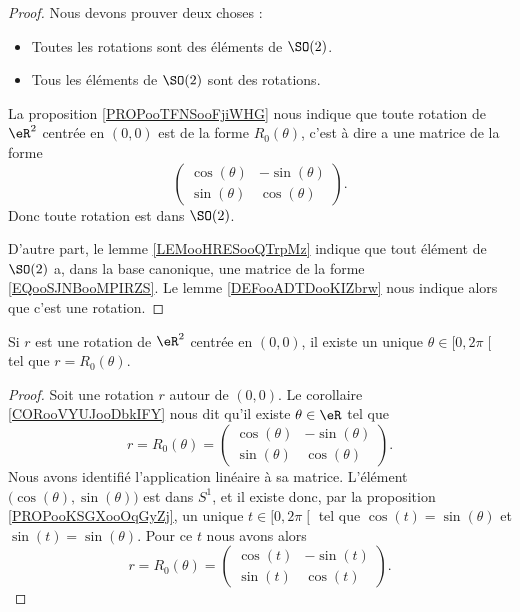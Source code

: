 \begin{proof}

    Nous devons prouver deux choses : 
    \begin{itemize}
        \item Toutes les rotations sont des éléments de \( \SO(2)\).
        \item Tous les éléments de \( \SO(2)\) sont des rotations.
    \end{itemize}

    La proposition \ref{PROPooTFNSooFjiWHG} nous indique que toute rotation de \( \eR^2\) centrée en \( (0,0)\) est de la forme \( R_0(\theta)\), c'est à dire a une matrice de la forme
    \begin{equation}        \label{EQooSJNBooMPIRZS}
        \begin{pmatrix}
            \cos(\theta)    &   -\sin(\theta)    \\
            \sin(\theta)    &   \cos(\theta)
        \end{pmatrix}.
    \end{equation}
    Donc toute rotation est dans \( \SO(2)\).

    D'autre part, le lemme \ref{LEMooHRESooQTrpMz} indique que tout élément de \( \SO(2)\) a, dans la base canonique, une matrice de la forme \eqref{EQooSJNBooMPIRZS}. Le lemme \ref{DEFooADTDooKIZbrw} nous indique alors que c'est une rotation.
\end{proof}

\begin{proposition}         \label{PROPooOTIVooZpvLnb}
    Si \( r\) est une rotation de \( \eR^2\) centrée en \( (0,0)\), il existe un unique \( \theta\in\mathopen[ 0 , 2\pi \mathclose[\) tel que \( r=R_0(\theta)\).
\end{proposition}

\begin{proof}
    Soit une rotation \( r\) autour de \( (0,0)\). Le corollaire \ref{CORooVYUJooDbkIFY} nous dit qu'il existe \( \theta\in \eR\) tel que
    \begin{equation}
        r=R_0(\theta)=\begin{pmatrix}
            \cos(\theta)    &   -\sin(\theta)    \\ 
            \sin(\theta)    &   \cos(\theta)    
        \end{pmatrix}.
    \end{equation}
    Nous avons identifié l'application linéaire à sa matrice. L'élément \( \big( \cos(\theta), \sin(\theta) \big)\) est dans \( S^1\), et il existe donc, par la proposition \ref{PROPooKSGXooOqGyZj}, un unique \( t\in \mathopen[ 0 , 2\pi \mathclose[\) tel que \( \cos(t)=\sin(\theta)\) et \( \sin(t)=\sin(\theta)\). Pour ce \( t\) nous avons alors
        \begin{equation}
        r=R_0(\theta)=\begin{pmatrix}
            \cos(t)    &   -\sin(t)    \\ 
            \sin(t)    &   \cos(t)    
        \end{pmatrix}.
        \end{equation}
\end{proof}

